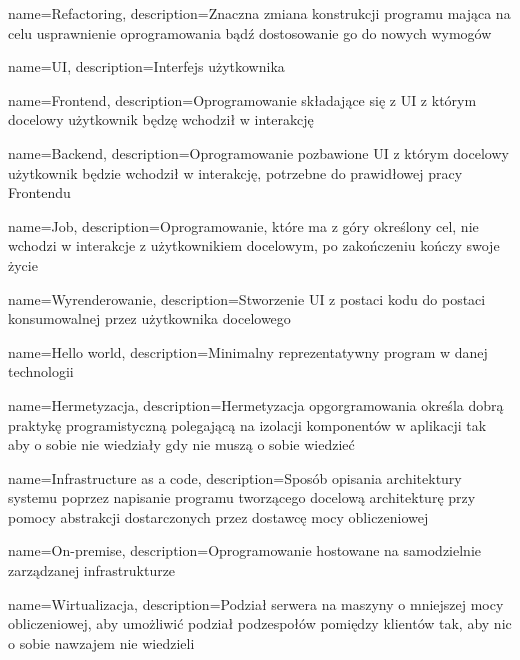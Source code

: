 {
    name={Refactoring},
    description={Znaczna zmiana konstrukcji programu mająca na celu usprawnienie oprogramowania bądź dostosowanie go do nowych wymogów}
}

{
    name={UI},
    description={Interfejs użytkownika}
}

{
    name={Frontend},
    description={Oprogramowanie składające się z UI z którym docelowy użytkownik będzę wchodził w interakcję}
}

{
    name={Backend},
    description={Oprogramowanie pozbawione UI z którym docelowy użytkownik będzie wchodził w interakcję, potrzebne do prawidłowej pracy Frontendu}
}

{
    name={Job},
    description={Oprogramowanie, które ma z góry określony cel, nie wchodzi w interakcje z użytkownikiem docelowym, po zakończeniu kończy swoje życie}
}


{
    name={Wyrenderowanie},
    description={Stworzenie UI z postaci kodu do postaci konsumowalnej przez użytkownika docelowego}
}

{
    name={Hello world},
    description={Minimalny reprezentatywny program w danej technologii}
}

{
    name={Hermetyzacja},
    description={Hermetyzacja opgorgramowania określa dobrą praktykę programistyczną polegającą na izolacji komponentów w aplikacji tak aby o sobie nie wiedziały gdy nie muszą o sobie wiedzieć}
}

{
    name={Infrastructure as a code},
    description={Sposób opisania architektury systemu poprzez napisanie programu tworzącego docelową architekturę przy pomocy abstrakcji dostarczonych przez dostawcę mocy obliczeniowej}
}

{
    name={On-premise},
    description={Oprogramowanie hostowane na samodzielnie zarządzanej infrastrukturze}
}

{
    name={Wirtualizacja},
    description={Podział serwera na maszyny o mniejszej mocy obliczeniowej, aby umożliwić podział podzespołów pomiędzy klientów tak, aby nic o sobie nawzajem nie wiedzieli}
}

